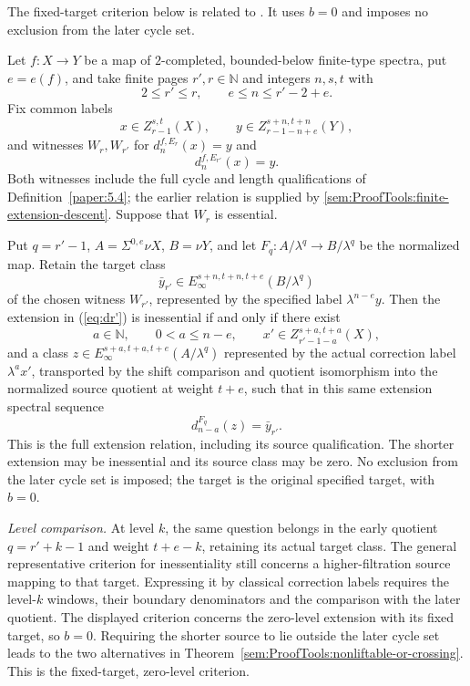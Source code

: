 \begin{proposition}
\label{paper:6.20}
The fixed-target criterion below is related to
\cite[Proposition 6.20, second assertion]{LWX126}. It uses $b=0$
and imposes no exclusion from the later cycle set.\par
\label{prop:dec738d3}
Let $f:X\to Y$ be a map of $2$-completed, bounded-below finite-type spectra, put $e=e(f)$, and take finite pages $r',r\in\mathbb N$ and integers $n,s,t$ with
\[
2\le r'\le r,\qquad e\le n\le r'-2+e.
\]
Fix common labels
\[
x\in Z_{r-1}^{s,t}(X),\qquad y\in Z_{r-1-n+e}^{s+n,t+n}(Y),
\]
and witnesses $W_r,W_{r'}$ for $d_n^{f,E_r}(x)=y$ and
\begin{equation}\label{eq:dr'}
d_n^{f,E_{r'}}(x)=y.
\end{equation}
Both witnesses include the full cycle and length qualifications of Definition~\ref{paper:5.4}; the earlier relation is supplied by \ref{sem:ProofTools:finite-extension-descent}. Suppose that $W_r$ is essential.

Put $q=r'-1$, $A=\Sigma^{0,e}\nu X$, $B=\nu Y$, and let $F_q:A/\lambda^q\to B/\lambda^q$ be the normalized map. Retain the target class
\[
\bar y_{r'}\in E_\infty^{s+n,t+n,t+e}(B/\lambda^q)
\]
of the chosen witness $W_{r'}$, represented by the specified label $\lambda^{n-e}y$. Then the extension in (\ref{eq:dr'}) is inessential if and only if there exist
\[
a\in\mathbb N,\qquad 0<a\le n-e,\qquad
x'\in Z_{r'-1-a}^{s+a,t+a}(X),
\]
and a class $z\in E_\infty^{s+a,t+a,t+e}(A/\lambda^q)$ represented by the actual correction label $\lambda^a x'$, transported by the shift comparison and quotient isomorphism into the normalized source quotient at weight $t+e$, such that in this same extension spectral sequence
\[
d_{n-a}^{F_q}(z)=\bar y_{r'}.
\]
This is the full extension relation, including its source qualification. The shorter extension may be inessential and its source class may be zero. No exclusion from the later cycle set is imposed; the target is the original specified target, with $b=0$.

\textit{Level comparison.}
At level $k$, the same question belongs in the early quotient
$q=r'+k-1$ and weight $t+e-k$, retaining its actual target class.
The general representative criterion for inessentiality still concerns
a higher-filtration source mapping to that target. Expressing it by
classical correction labels requires the level-$k$ windows, their
boundary denominators and the comparison with the later quotient.
The displayed criterion concerns the zero-level extension with its
fixed target, so $b=0$. Requiring the shorter source to lie outside
the later cycle set leads to the two alternatives in
Theorem~\ref{sem:ProofTools:nonliftable-or-crossing}.
This is the fixed-target, zero-level criterion.
\end{proposition}
